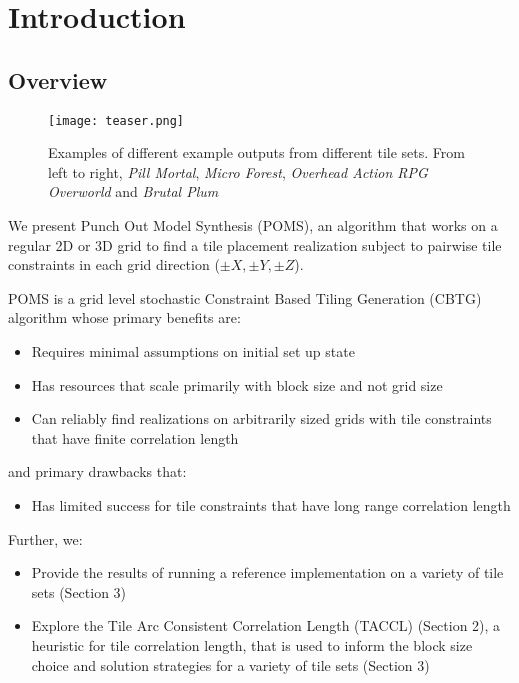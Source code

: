 \section{Introduction}

\subsection{Overview}

\begin{figure*}[ht]
  \texttt{[image: teaser.png]}
  \caption{Examples of different example outputs from different tile sets. From left to right, \textit{Pill Mortal}, \textit{Micro Forest}, \textit{Overhead Action RPG Overworld} and \textit{Brutal Plum}}
  \label{fig:teaser}
\end{figure*}


We present Punch Out Model Synthesis (POMS), an algorithm that works on a regular 2D or 3D
grid to find a tile placement realization subject to pairwise tile constraints in each grid direction
($\pm X, \pm Y, \pm Z$).

POMS is a grid level stochastic Constraint Based Tiling Generation (CBTG) algorithm whose primary benefits are:

\begin{itemize}
  \item Requires minimal assumptions on initial set up state
  \item Has resources that scale primarily with block size and not grid size
  \item Can reliably find realizations on arbitrarily sized grids with tile constraints that have finite correlation length
\end{itemize}

and primary drawbacks that:

\begin{itemize}
  \item Has limited success for tile constraints that have long range correlation length
\end{itemize}

Further, we:

\begin{itemize}
  \item Provide the results of running a reference implementation on a variety of tile sets (Section 3)
  \item Explore the Tile Arc Consistent Correlation Length (TACCL) (Section 2), a heuristic for tile correlation length,
        that is used to inform the block size choice and solution strategies for a variety of tile sets (Section 3)
\end{itemize}

